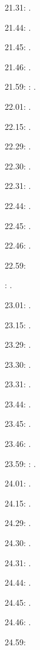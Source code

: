 \documentclass[italian]{article}
\begin{document}
21.31:     .

21.44:     .

21.45:     .

21.46:     .

21.59:     
:    .

22.01:     . 

22.15:     . 

22.29:     . 

22.30:     .

22.31:     .

22.44:     .

22.45:     .

22.46:     .

22.59:     

:    .

23.01:     . 

23.15:     . 

23.29:     . 

23.30:     .

23.31:     .

23.44:     .

23.45:     .

23.46:     .

23.59:     
:    .

24.01:     . 

24.15:     . 

24.29:     . 

24.30:     .

24.31:     .

24.44:     .

24.45:     .

24.46:     .

24.59:     
\end{document}
